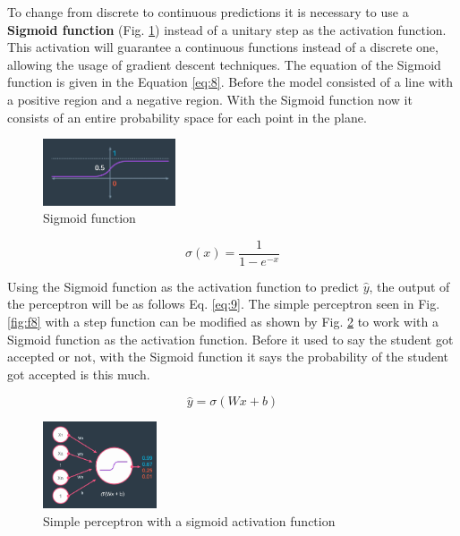 \documentclass{article}
\begin{document}
To change from discrete to continuous predictions it is necessary to use a \textbf{Sigmoid function} (Fig. \ref{fig:f19}) instead of a unitary step as the activation function. This activation will guarantee a continuous functions instead of a discrete one, allowing the usage of gradient descent techniques. The equation of the Sigmoid function is given in the Equation \eqref{eq:8}. Before the model consisted of a line with a positive region and a negative region. With the Sigmoid function now it consists of an entire probability space for each point in the plane.

\begin{figure}[ht]
    \centering
    \includegraphics[width=0.35\textwidth,height=0.35\textheight,keepaspectratio]{images/sigmoid.png}
    \captionsetup{justification=centering}
    \caption{Sigmoid function}
    \label{fig:f19}
\end{figure}

\begin{equation}
\label{eq:8}
\sigma(x) = \frac{1}{1 - e^{-x}} 
\end{equation}  

Using the Sigmoid function as the activation function to predict \(\hat{y}\), the output of the perceptron will be as follows Eq. \eqref{eq:9}. The simple perceptron seen in Fig. \ref{fig:f8} with a step function can be modified as shown by Fig. \ref{fig:f20} to work with a Sigmoid function as the activation function.  Before it used to say the student got accepted or not, with the Sigmoid function it says the probability of the student got accepted is this much.

\begin{equation}
\label{eq:9}
\hat{y} = \sigma(Wx + b)
\end{equation} 

\begin{figure}[ht]
    \centering
    \includegraphics[width=0.30\textwidth,height=0.30\textheight,keepaspectratio]{images/perceptron_sigmoid.png}
    \captionsetup{justification=centering}
    \caption{Simple perceptron with a sigmoid activation function}
    \label{fig:f20}
\end{figure}
\end{document}
